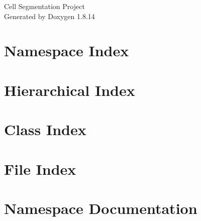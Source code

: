 \documentclass[twoside]{book}
\newcommand{\+}{\discretionary{\mbox{\scriptsize$\hookleftarrow$}}{}{}}
\newcommand{\clearemptydoublepage}{%
  \newpage{\pagestyle{empty}\cleardoublepage}%
}
\begin{document}
\hypersetup{pageanchor=false,
             bookmarksnumbered=true,
             pdfencoding=unicode
            }
\begin{titlepage}
\vspace*{7cm}
\begin{center}%
{\Large Cell Segmentation Project }\\
\vspace*{1cm}
{\large Generated by Doxygen 1.8.14}\\
\end{center}
\end{titlepage}
\clearemptydoublepage
{}
\tableofcontents
\clearemptydoublepage
{}
\hypersetup{pageanchor=true}

\chapter{Namespace Index}

\chapter{Hierarchical Index}

\chapter{Class Index}

\chapter{File Index}

\chapter{Namespace Documentation}





















\end{document}
